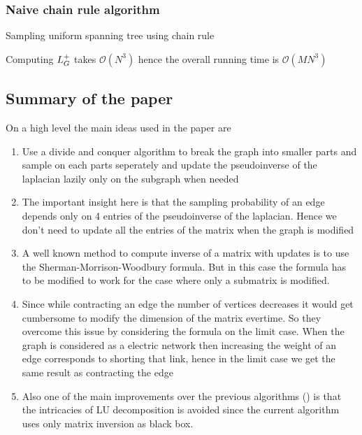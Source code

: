 \subsubsection{Naive chain rule algorithm}




\begin{algorithm}[H]
 
 \caption{Sampling uniform spanning tree using chain rule}
\end{algorithm}

Computing $L_{G}^{+}$ takes $\mathcal{O}(N^3)$ hence the overall running time is $\mathcal{O}(MN^3)$

\subsection{Summary of the paper}

On a high level the main ideas used in the paper are 

\begin{enumerate}
 \item Use a divide and conquer algorithm to break the graph into smaller parts and sample on each parts seperately and update the pseudoinverse of the laplacian lazily only on the subgraph when needed
 \item The important insight here is that the sampling probability of an edge depends only on 4 entries of the pseudoinverse of the laplacian. Hence we don't need to update all the entries of the matrix when the graph is modified
 \item A well known method to compute inverse of a matrix with updates is to use the Sherman-Morrison-Woodbury formula. But in this case the formula has to be modified to work for the case where only a submatrix is modified.
 \item Since while contracting an edge the number of vertices decreases it would get cumbersome to modify the dimension of the matrix evertime. So they overcome this issue by considering the formula on the limit case. When the graph is considered as a electric network then increasing the weight of an edge corresponds to shorting that link, hence in the limit case we get the same result as contracting the edge
\item Also one of the main improvements over the previous algorithms (\cite{COLBOURN1996268}) is that the intricacies of LU decomposition is avoided since the current algorithm uses only matrix inversion as black box. 
\end{enumerate}

